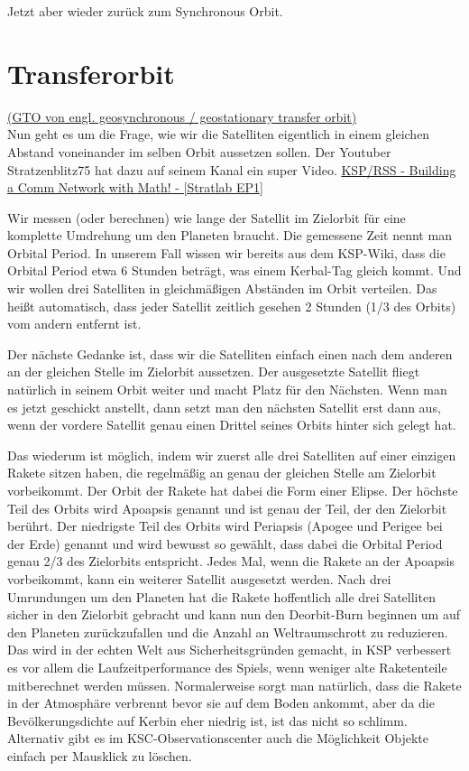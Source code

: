 \documentclass[12pt,paper=A4,numbers=noenddot,bibliography=totoc,listof=totoc,DIV=11,BCOR=1mm]{scrreprt}
\newcommand{\gq}[1]{\glqq #1\grqq} %
\begin{document}
\medskip Jetzt aber wieder zurück zum \gq{Synchronous Orbit}.

\section{Transferorbit}
\href{https://en.wikipedia.org/wiki/Geostationary_transfer_orbit}{(GTO von engl. geosynchronous / geostationary transfer orbit)}\\
Nun geht es um die Frage, wie wir die Satelliten eigentlich in einem gleichen Abstand voneinander im selben Orbit aussetzen sollen.
Der Youtuber \gq{Stratzenblitz75} hat dazu auf seinem Kanal ein super Video.
\href{https://youtu.be/3Qb_gcJyGQI}{KSP/RSS - Building a Comm Network with Math! - [Stratlab EP1]}

Wir messen (oder berechnen) wie lange der Satellit im Zielorbit für eine komplette Umdrehung um den Planeten braucht. Die gemessene Zeit nennt man \gq{Orbital Period}. In unserem Fall wissen wir bereits aus dem KSP-Wiki, dass die Orbital Period etwa 6 Stunden beträgt, was einem Kerbal-Tag gleich kommt.
Und wir wollen drei Satelliten in gleichmäßigen Abständen im Orbit verteilen. Das heißt automatisch, dass jeder Satellit zeitlich gesehen 2 Stunden (1/3 des Orbits) vom andern entfernt ist.

Der nächste Gedanke ist, dass wir die Satelliten einfach einen nach dem anderen an der gleichen Stelle im Zielorbit aussetzen. Der ausgesetzte Satellit fliegt natürlich in seinem Orbit weiter und macht Platz für den Nächsten. Wenn man es jetzt geschickt anstellt, dann setzt man den nächsten Satellit erst dann aus, wenn der vordere Satellit genau einen Drittel seines Orbits hinter sich gelegt hat.

Das wiederum ist möglich, indem wir zuerst alle drei Satelliten auf einer einzigen Rakete sitzen haben, die regelmäßig an genau der gleichen Stelle am Zielorbit vorbeikommt.
Der Orbit der Rakete hat dabei die Form einer Elipse. Der höchste Teil des Orbits wird Apoapsis genannt und ist genau der Teil, der den Zielorbit berührt. Der niedrigste Teil des Orbits wird Periapsis (Apogee und Perigee bei der Erde) genannt und wird bewusst so gewählt, dass dabei die Orbital Period genau 2/3 des Zielorbits entspricht.
Jedes Mal, wenn die Rakete an der Apoapsis vorbeikommt, kann ein weiterer Satellit ausgesetzt werden.
Nach drei Umrundungen um den Planeten hat die Rakete hoffentlich alle drei Satelliten sicher in den Zielorbit gebracht und kann nun den Deorbit-Burn beginnen um auf den Planeten zurückzufallen und die Anzahl an Weltraumschrott zu reduzieren. Das wird in der echten Welt aus Sicherheitsgründen gemacht, in KSP verbessert es vor allem die Laufzeitperformance des Spiels, wenn weniger alte Raketenteile mitberechnet werden müssen. Normalerweise sorgt man natürlich, dass die Rakete in der Atmosphäre verbrennt bevor sie auf dem Boden ankommt, aber da die Bevölkerungsdichte auf Kerbin eher niedrig ist, ist das nicht so schlimm.
Alternativ gibt es im KSC-Observationscenter auch die Möglichkeit Objekte einfach per Mausklick zu löschen.
\end{document}

